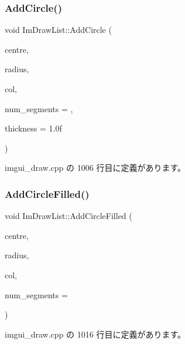 \subsubsection{\texorpdfstring{Add\+Circle()}{AddCircle()}}
{\footnotesize\ttfamily void Im\+Draw\+List\+::\+Add\+Circle (\begin{DoxyParamCaption}\item[{const \mbox{\hyperlink{struct_im_vec2}{Im\+Vec2}} \&}]{centre,  }\item[{float}]{radius,  }\item[{\mbox{\hyperlink{imgui_8h_a118cff4eeb8d00e7d07ce3d6460eed36}{Im\+U32}}}]{col,  }\item[{int}]{num\+\_\+segments = {},  }\item[{float}]{thickness = {\ttfamily 1.0f} }\end{DoxyParamCaption})}



 imgui\+\_\+draw.\+cpp の 1006 行目に定義があります。

\mbox{\label{struct_im_draw_list_a293e87d22e17587e3994cf6deb20be45}} 
\subsubsection{\texorpdfstring{Add\+Circle\+Filled()}{AddCircleFilled()}}
{\footnotesize\ttfamily void Im\+Draw\+List\+::\+Add\+Circle\+Filled (\begin{DoxyParamCaption}\item[{const \mbox{\hyperlink{struct_im_vec2}{Im\+Vec2}} \&}]{centre,  }\item[{float}]{radius,  }\item[{\mbox{\hyperlink{imgui_8h_a118cff4eeb8d00e7d07ce3d6460eed36}{Im\+U32}}}]{col,  }\item[{int}]{num\+\_\+segments = {} }\end{DoxyParamCaption})}



 imgui\+\_\+draw.\+cpp の 1016 行目に定義があります。

